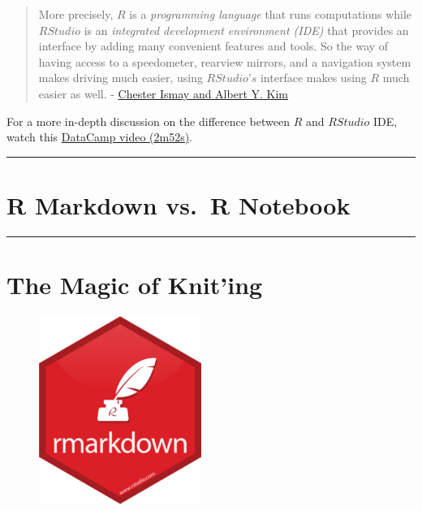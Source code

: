 \documentclass[]{book}
\begin{document}
\begin{quote}
More precisely, \(R\) is a \emph{programming language} that runs
computations while \(R Studio\) is an \emph{integrated development
environment (IDE)} that provides an interface by adding many convenient
features and tools. So the way of having access to a speedometer,
rearview mirrors, and a navigation system makes driving much easier,
using \(RStudio’s\) interface makes using \(R\) much easier as well. -
\href{https://ismayc.github.io/moderndive/index.html}{Chester Ismay and
Albert Y. Kim}
\end{quote}

\begin{rmdtip}
For a more in-depth discussion on the difference between \(R\) and
\(R Studio\) IDE, watch this
\href{https://campus.datacamp.com/courses/working-with-the-rstudio-ide-part-1/orientation?ex=1}{DataCamp
video (2m52s)}.
\end{rmdtip}

\begin{center}\rule{0.5\linewidth}{\linethickness}\end{center}

\section{R Markdown vs.~R Notebook}\label{r-markdown-vs.r-notebook}

\begin{center}\rule{0.5\linewidth}{\linethickness}\end{center}

\section{The Magic of Knit'ing}\label{the-magic-of-kniting}

\begin{figure}
\centering
\includegraphics{images/hex/rmarkdown-200x232.png}
\caption{}
\end{figure}
\end{document}
